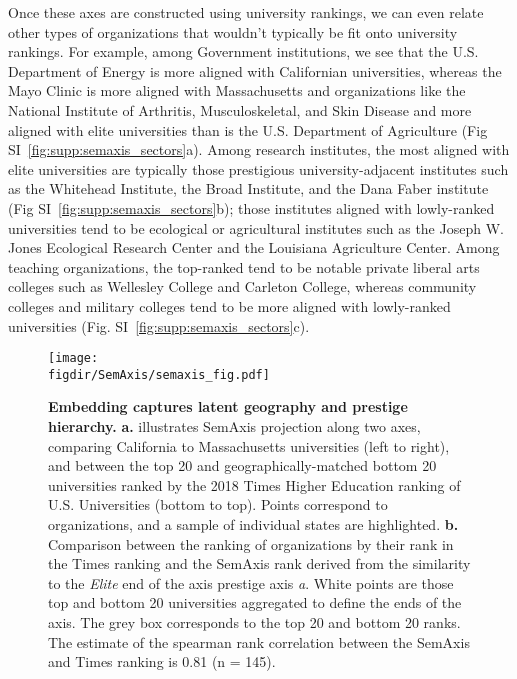 \documentclass[12pt]{article} %
\def\figdir{../Figs}
\begin{document}
Once these axes are constructed using university rankings, we can even relate other types of organizations that wouldn't typically be fit onto university rankings.
For example, among Government institutions, we see that the U.S. Department of Energy is more aligned with Californian universities, whereas the Mayo Clinic is more aligned with Massachusetts and organizations like the National Institute of Arthritis, Musculoskeletal, and Skin Disease and more aligned with elite universities than is the U.S. Department of Agriculture (Fig SI~\ref{fig:supp:semaxis_sectors}a).
Among research institutes, the most aligned with elite universities are typically those prestigious university-adjacent institutes such as the Whitehead Institute, the Broad Institute, and the Dana Faber institute (Fig SI~\ref{fig:supp:semaxis_sectors}b); those institutes aligned with lowly-ranked universities tend to be ecological or agricultural institutes such as the Joseph W. Jones Ecological Research Center and the Louisiana Agriculture Center. 
Among teaching organizations, the top-ranked tend to be notable private liberal arts colleges such as Wellesley College and Carleton College, whereas community colleges and military colleges tend to be more aligned with lowly-ranked universities (Fig. SI~\ref{fig:supp:semaxis_sectors}c). 

%
%
\begin{figure}[hp!]
	\centering
	\label{fig:semaxis}
	\texttt{[image: \\figdir/SemAxis/semaxis\_fig.pdf]}
	\caption{
		\textbf{Embedding captures latent geography and prestige hierarchy.}
		\textbf{a.} illustrates SemAxis projection along two axes, comparing California to Massachusetts universities (left to right), and between the top 20 and geographically-matched bottom 20 universities ranked by the 2018 Times Higher Education ranking of U.S. Universities (bottom to top). 
		Points correspond to organizations, and a sample of individual states are highlighted. 
		\textbf{b.} Comparison between the ranking of organizations by their rank in the Times ranking and the SemAxis rank derived from the similarity to the \textit{Elite} end of the axis prestige axis \textit{a}.
		White points are those top and bottom 20 universities aggregated to define the ends of the axis. 
		The grey box corresponds to the top 20 and bottom 20 ranks. 
	  	The estimate of the spearman rank correlation between the SemAxis and Times ranking is 0.81 (n = 145).
	}
\end{figure}
\end{document}
